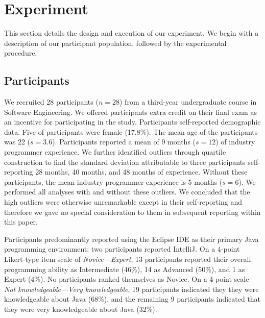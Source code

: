 \documentclass[conference]{IEEEtran}
\begin{document}
\section{Experiment}

This section details the design and execution of our experiment. We begin with a description of our participant population, followed by the experimental procedure.

\subsection{Participants}

We recruited 28 participants ($n = 28$) from a third-year undergraduate course in Software Engineering. We offered participants extra credit on their final exam as an incentive for participating in the study. Participants self-reported demographic data. Five of participants were female (17.8\%). The mean age of the participants was 22 ($s = 3.6$). Participants reported a mean of 9 months ($s = 12$) of industry programmer experience. We further identified outliers through quartile construction to find the standard deviation attributable to three participants self-reporting 28 months, 40 months, and 48 months of experience. Without these participants, the mean industry programmer experience is 5 months ($s = 6$). We performed all analyses with and without these outliers. We concluded that the high outliers were otherwise unremarkable except in their self-reporting and therefore we gave no special consideration to them in subsequent reporting within this paper.

Participants predominantly reported using the Eclipse IDE as their primary Java programming environment; two participants reported IntelliJ. On a 4-point Likert-type item scale of \emph{Novice---Expert}, 13 participants reported their overall programming ability as Intermediate (46\%), 14 as Advanced (50\%), and 1 as Expert (4\%). No participants ranked themselves as Novice. On a 4-point scale \emph{Not knowledgeable---Very knowledgeable}, 19 participants indicated they they were knowledgeable about Java (68\%), and the remaining 9 participants indicated that they were very knowledgeable about Java (32\%).


\end{document}
